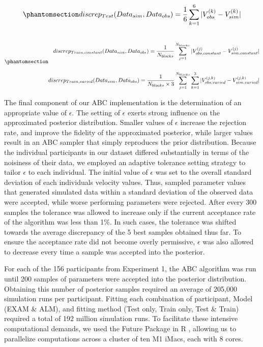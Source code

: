 \documentclass[
  12pt,
  letterpaper,
]{article}
\begin{document}
\begin{tcolorbox}[enhanced jigsaw, toprule=.15mm, leftrule=.75mm, colframe=quarto-callout-color-frame, colback=white, left=2mm, breakable, bottomrule=.15mm, arc=.35mm, opacityback=0, rightrule=.15mm]
\begin{equation}\phantomsection\label{eq-discrep-test}{
discrep_{Test}(Data_{sim}, Data_{obs}) = \frac{1}{6} \sum_{k=1}^{6} |V_{obs}^{(k)} - V_{sim}^{(k)}|
}\end{equation}

\begin{equation}\phantomsection\label{eq-discrep-train}{
\begin{aligned} \\
discrep_{Train,constant}(Data_{sim}, Data_{obs}) = \frac{1}{N_{blocks}} \sum_{j=1}^{N_{blocks}} |V_{obs,constant}^{(j)} - V_{sim,constant}^{(j)}| \\ \\
discrep_{Train,varied}(Data_{sim}, Data_{obs}) = \frac{1}{N_{blocks} \times 3} \sum_{j=1}^{N_{blocks}} \sum_{k=1}^{3} |V_{obs,varied}^{(j,k)} - V_{sim,varied}^{(j,k)}|
\end{aligned}
}\end{equation}

The final component of our ABC implementation is the determination of an
appropriate value of \(\epsilon\). The setting of \(\epsilon\) exerts
strong influence on the approximated posterior distribution. Smaller
values of \(\epsilon\) increase the rejection rate, and improve the
fidelity of the approximated posterior, while larger values result in an
ABC sampler that simply reproduces the prior distribution. Because the
individual participants in our dataset differed substantially in terms
of the noisiness of their data, we employed an adaptive tolerance
setting strategy to tailor \(\epsilon\) to each individual. The initial
value of \(\epsilon\) was set to the overall standard deviation of each
individuals velocity values. Thus, sampled parameter values that
generated simulated data within a standard deviation of the observed
data were accepted, while worse performing parameters were rejected.
After every 300 samples the tolerance was allowed to increase only if
the current acceptance rate of the algorithm was less than 1\%. In such
cases, the tolerance was shifted towards the average discrepancy of the
5 best samples obtained thus far. To ensure the acceptance rate did not
become overly permissive, \(\epsilon\) was also allowed to decrease
every time a sample was accepted into the posterior.

\end{tcolorbox}

For each of the 156 participants from Experiment 1, the ABC algorithm
was run until 200 samples of parameters were accepted into the posterior
distribution. Obtaining this number of posterior samples required an
average of 205,000 simulation runs per participant. Fitting each
combination of participant, Model (EXAM \& ALM), and fitting method
(Test only, Train only, Test \& Train) required a total of 192 million
simulation runs. To facilitate these intensive computational demands, we
used the Future Package in R
\autocite{bengtssonUnifyingFrameworkParallel2021}, allowing us to
parallelize computations across a cluster of ten M1 iMacs, each with 8
cores.
\end{document}
